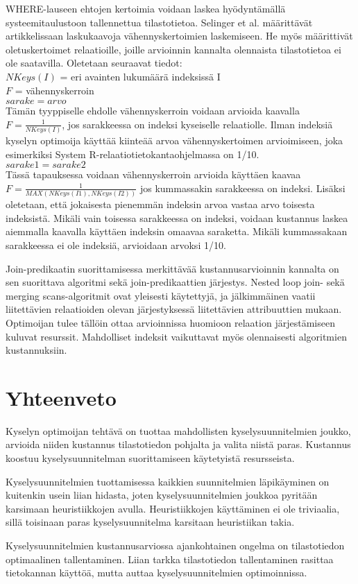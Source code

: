 \documentclass[finnish]{tktltiki2}
\theoremstyle{definition}
\theoremstyle{remark}
\begin{document}
WHERE-lauseen ehtojen kertoimia voidaan laskea hyödyntämällä systeemitaulustoon tallennettua tilastotietoa. Selinger et al. määrittävät artikkelissaan \cite{selinger1979access} laskukaavoja vähennyskertoimien laskemiseen. He myös määrittivät oletuskertoimet relaatioille, joille arvioinnin kannalta olennaista tilastotietoa ei ole saatavilla. Oletetaan seuraavat tiedot:
\\\newline
$NKeys(I)$ = eri avainten lukumäärä indeksissä I
\\
$F$ = vähennyskerroin
\\\newline
$sarake = arvo$ 
\\
Tämän tyyppiselle ehdolle vähennyskerroin voidaan arvioida kaavalla $F = \frac{1}{NKeys(I)}$, jos sarakkeessa on indeksi kyseiselle relaatiolle. \cite{selinger1979access} Ilman indeksiä kyselyn optimoija käyttää kiinteää arvoa vähennyskertoimen arvioimiseen, joka esimerkiksi System R-relaatiotietokantaohjelmassa on 1/10.
\\\newline
$sarake1 = sarake2$ 
\\
Tässä tapauksessa voidaan vähennyskerroin arvioida käyttäen kaavaa $F = \frac{1}{MAX (NKeys(I1), NKeys(I2))}$ jos kummassakin sarakkeessa on indeksi. Lisäksi oletetaan, että jokaisesta pienemmän indeksin arvoa vastaa arvo toisesta indeksistä. Mikäli vain toisessa sarakkeessa on indeksi, 
voidaan kustannus laskea aiemmalla kaavalla käyttäen indeksin omaavaa saraketta. Mikäli kummassakaan sarakkeessa ei ole indeksiä, arvioidaan arvoksi 1/10.

Join-predikaatin suorittamisessa merkittävää kustannusarvioinnin kannalta on sen suorittava algoritmi sekä join-predikaattien järjestys. Nested loop join- sekä merging scans-algoritmit ovat yleisesti käytettyjä, ja jälkimmäinen vaatii liitettävien relaatioiden olevan järjestyksessä liitettävien attribuuttien mukaan. Optimoijan tulee tällöin ottaa arvioinnissa huomioon relaation järjestämiseen kuluvat resurssit. Mahdolliset indeksit vaikuttavat myös olennaisesti algoritmien kustannuksiin. 
\section{Yhteenveto}
Kyselyn optimoijan tehtävä on tuottaa mahdollisten kyselysuunnitelmien joukko, arvioida niiden kustannus tilastotiedon pohjalta ja valita niistä paras. Kustannus koostuu kyselysuunnitelman suorittamiseen käytetyistä resursseista. 

Kyselysuunnitelmien tuottamisessa kaikkien suunnitelmien läpikäyminen on kuitenkin usein liian hidasta, joten kyselysuunnitelmien joukkoa pyritään karsimaan heuristiikkojen avulla. Heuristiikkojen käyttäminen ei ole triviaalia, sillä toisinaan paras kyselysuunnitelma karsitaan heuristiikan takia.

Kyselysuunnitelmien kustannusarviossa ajankohtainen ongelma on tilastotiedon optimaalinen tallentaminen. Liian tarkka tilastotiedon tallentaminen rasittaa tietokannan käyttöä, mutta auttaa kyselysuunnitelmien optimoinnissa.
\newpage

%


\end{document}
